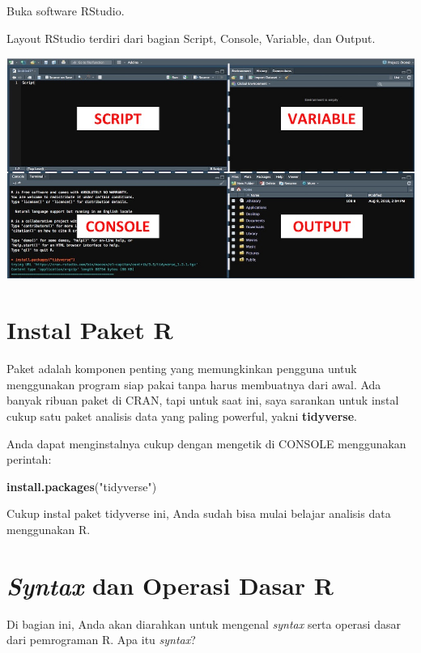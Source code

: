 \documentclass[openany]{book}
\newenvironment{Shaded}{\begin{snugshade}}{\end{snugshade}}
\newcommand{\KeywordTok}[1]{\textcolor[rgb]{0.13,0.29,0.53}{\textbf{#1}}}
\newcommand{\StringTok}[1]{\textcolor[rgb]{0.31,0.60,0.02}{#1}}
\newcommand{\NormalTok}[1]{#1}
\begin{document}
Buka software RStudio.

Layout RStudio terdiri dari bagian Script, Console, Variable, dan
Output.

\includegraphics[width=1\linewidth]{images/Rstudio_Layout}

\section{Instal Paket R}\label{instal-paket-r}

Paket adalah komponen penting yang memungkinkan pengguna untuk
menggunakan program siap pakai tanpa harus membuatnya dari awal. Ada
banyak ribuan paket di CRAN, tapi untuk saat ini, saya sarankan untuk
instal cukup satu paket analisis data yang paling powerful, yakni
\textbf{tidyverse}.

Anda dapat menginstalnya cukup dengan mengetik di CONSOLE menggunakan
perintah:

\begin{Shaded}
\begin{Highlighting}[]
\KeywordTok{install.packages}\NormalTok{(}\StringTok{"tidyverse"}\NormalTok{)}
\end{Highlighting}
\end{Shaded}

Cukup instal paket tidyverse ini, Anda sudah bisa mulai belajar analisis
data menggunakan R.

\section{\texorpdfstring{\emph{Syntax} dan Operasi Dasar
R}{Syntax dan Operasi Dasar R}}\label{syntax-dan-operasi-dasar-r}

Di bagian ini, Anda akan diarahkan untuk mengenal \emph{syntax} serta
operasi dasar dari pemrograman R. Apa itu \emph{syntax}?
\end{document}
